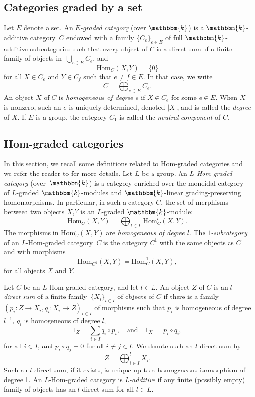 \documentclass[a4paper, oneside]{amsart}
\numberwithin{equation}{subsection}
\theoremstyle{referencedlemma}
\theoremstyle{plain} %
\theoremstyle{remark}
\begin{document}
\subsection{Categories graded by a set}\label{Section_Set-graded}

Let $E$ denote a set. An \emph{$E$-graded category} (over $\mathbbm{k}$) is a $\mathbbm{k}$-additive category~$C$ endowed with a family $\{C_e\}_{e\in E}$ of full $\mathbbm{k}$-additive subcategories such that every object of $C$ is a direct sum of a finite family of objects in~$\bigcup_{e\in E} C_e$, and 
$$
\mathrm{Hom}_C(X,Y) = \{0\}
$$
for all $X\in C_e$ and $Y\in C_f$ such that $e\neq f\in E$. In that case, we write 
$$
C = \bigoplus_{e\in E}C_e.
$$
An object $X$ of $C$ is \emph{homogeneous of degree $e$} if $X\in C_e$ for some $e\in E$.  When $X$ is nonzero, such an $e$ is uniquely determined, denoted $\vert X \rvert$, and is called the \emph{degree} of $X$.  If $E$ is a group, the category $C_1$ is called the \emph{neutral component} of $C$. 

\subsection{Hom-graded categories}\label{Hom-graded categories}
In this section, we recall some definitions related to Hom-graded categories and we refer the reader to \cite{sozer_monoidal_2023} for more details.  Let $L$ be a group. An \emph{$L$-Hom-graded category} (over~$\mathbbm{k}$) is a category enriched over the monoidal category of $L$-graded $\mathbbm{k}$-modules and $\mathbbm{k}$-linear grading-preserving homomorphisms. In particular, in such a category $C$, the set of morphisms between two objects $X$,$Y$ is an $L$-graded $\mathbbm{k}$-module:
$$
\mathrm{Hom}_C(X,Y) = \bigoplus_{l\in L}\mathrm{Hom}_C^l(X,Y).
$$
The morphisms in $\mathrm{Hom}_C^l(X,Y)$ are \emph{homogeneous of degree $l$}.  The \emph{$1$-subcategory} of an $L$-Hom-graded category~$C$ is the category $C^1$ with the same objects as $C$ and with morphisms
$$
\mathrm{Hom}_{C^1}(X,Y) = \mathrm{Hom}_C^1(X,Y),
$$
for all objects $X$ and $Y$. 

Let $C$ be an $L$-Hom-graded category, and let $l\in L$. An object $Z$ of $C$ is an \emph{$l$-direct sum} of a finite family~$\{X_i\}_{i\in I}$ of objects of $C$ if there is a family $(p_i\colon Z \to X_i, q_i\colon X_i \to Z)_{i\in I}$ of morphisms such that $p_i$ is homogeneous of degree $l^{-1}$, $q_i$ is homogeneous of degree $l$,
$$
1_Z = \sum_{i\in I} q_i\circ p_i, \quad \text{and} \quad  1_{X_i} = p_i \circ q_i,
$$
for all $i\in I$, and $p_i \circ q_j = 0$ for all $i\neq j \in I$.  We denote such an $l$-direct sum by
$$
Z = \bigoplus_{i\in I}^l X_i.
$$
Such an $l$-direct sum, if it exists, is unique up to a homogeneous isomorphism of degree 1.  An $L$-Hom-graded category is \emph{$L$-additive} if any finite (possibly empty) family of objects has an $l$-direct sum for all $l\in L$. 
\end{document}
